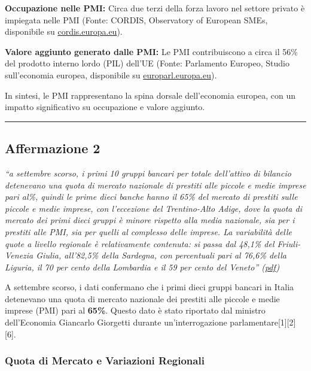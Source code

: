 \documentclass[
  letterpaper,
  DIV=11,
  numbers=noendperiod]{scrartcl}
\begin{document}
\textbf{Occupazione nelle PMI:} Circa due terzi della forza lavoro nel
settore privato è impiegata nelle PMI (Fonte: CORDIS, Observatory of
European SMEs, disponibile su
\href{https://cordis.europa.eu/article/id/18356-observatory-of-european-smes-publishes-first-three-reports}{cordis.europa.eu}).

\textbf{Valore aggiunto generato dalle PMI:} Le PMI contribuiscono a
circa il 56\% del prodotto interno lordo (PIL) dell'UE (Fonte:
Parlamento Europeo, Studio sull'economia europea, disponibile su
\href{https://www.europarl.europa.eu/RegData/etudes/ATAG/2021/690633/EPRS_ATA\%282021\%29690633_IT.pdf}{europarl.europa.eu}).

In sintesi, le PMI rappresentano la spina dorsale dell'economia europea,
con un impatto significativo su occupazione e valore aggiunto.

\begin{center}\rule{0.5\linewidth}{0.5pt}\end{center}

\subsection{Affermazione 2}\label{affermazione-2}

\emph{``a settembre scorso, i primi 10 gruppi bancari per totale
dell'attivo di bilancio detenevano una quota di mercato nazionale di
prestiti alle piccole e medie imprese pari al\%, quindi le prime dieci
banche hanno il 65\% del mercato di prestiti sulle piccole e medie
imprese, con l'eccezione del Trentino-Alto Adige, dove la quota di
mercato dei primi dieci gruppi è minore rispetto alla media nazionale,
sia per i prestiti alle PMI, sia per quelli al complesso delle imprese.
La variabilità delle quote a livello regionale è relativamente
contenuta: si passa dal 48,1\% del Friuli-Venezia Giulia, all'82,5\%
della Sardegna, con percentuali pari al 76,6\% della Liguria, il 70 per
cento della Lombardia e il 59 per cento del Veneto''
(\href{zotero://open-pdf/library/items/B4RMZ7B3?page=1&annotation=T4DLE8D4}{pdf})}

A settembre scorso, i dati confermano che i primi dieci gruppi bancari
in Italia detenevano una quota di mercato nazionale dei prestiti alle
piccole e medie imprese (PMI) pari al \textbf{65\%}. Questo dato è stato
riportato dal ministro dell'Economia Giancarlo Giorgetti durante
un'interrogazione parlamentare{[}1{]}{[}2{]}{[}6{]}.

\subsubsection{Quota di Mercato e Variazioni
Regionali}\label{quota-di-mercato-e-variazioni-regionali}
\end{document}

